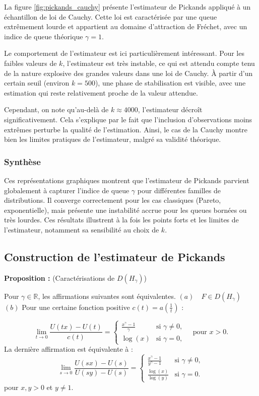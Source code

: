 \documentclass{article}
\theoremstyle{plain}
\theoremstyle{definition}
\theoremstyle{plain}
\begin{document}
La figure \ref{fig:pickands_cauchy} présente l’estimateur de Pickands appliqué à un échantillon de loi de Cauchy. Cette loi est caractérisée par une queue extrêmement lourde et appartient au domaine d’attraction de Fréchet, avec un indice de queue théorique \(\gamma = 1\).

Le comportement de l’estimateur est ici particulièrement intéressant. Pour les faibles valeurs de \(k\), l’estimateur est très instable, ce qui est attendu compte tenu de la nature explosive des grandes valeurs dans une loi de Cauchy. À partir d’un certain seuil (environ \(k = 500\)), une phase de stabilisation est visible, avec une estimation qui reste relativement proche de la valeur attendue.

Cependant, on note qu’au-delà de \(k \approx 4000\), l’estimateur décroît significativement. Cela s’explique par le fait que l’inclusion d’observations moins extrêmes perturbe la qualité de l’estimation.
Ainsi, le cas de la Cauchy montre bien les limites pratiques de l’estimateur, malgré sa validité théorique.

\subsubsection{Synthèse}
Ces représentations graphiques montrent que l’estimateur de Pickands parvient globalement à capturer l’indice de queue \(\gamma\) pour différentes familles de distributions. Il converge correctement pour les cas classiques (Pareto, exponentielle), mais présente une instabilité accrue pour les queues bornées ou très lourdes. Ces résultats illustrent à la fois les points forts et les limites de l’estimateur, notamment sa sensibilité au choix de \(k\).

\subsection{Construction de l'estimateur de Pickands}
\textbf{Proposition :} (Caractérisations de \( D(H_{\gamma}) \))

Pour \( \gamma \in \mathbb{R} \), les affirmations suivantes sont équivalentes. \newline
\( (a) \quad F \in D(H_{\gamma}) \) \newline
\( (b) \) Pour une certaine fonction positive \( c(t) = a\left( \frac{1}{t} \right) \) :

\[
\lim_{t \to 0} \frac{U(tx) - U(t)}{c(t)} = 
\begin{cases} 
\frac{x^\gamma - 1}{\gamma} & \text{si } \gamma \neq 0, \\
\log(x) & \text{si } \gamma = 0, 
\end{cases}
\quad \text{pour } x > 0.
\]
La dernière affirmation est équivalente à :
\[
\lim_{s \to 0} \frac{U(sx) - U(s)}{U(sy) - U(s)} = 
\begin{cases} 
\frac{x^\gamma - 1}{y^\gamma - 1} & \text{si } \gamma \neq 0, \\
\frac{\log(x)}{\log(y)} & \text{si } \gamma = 0.
\end{cases}
\]
pour \(x,y > 0\) et \(y \neq 1\). \newline
\end{document}
